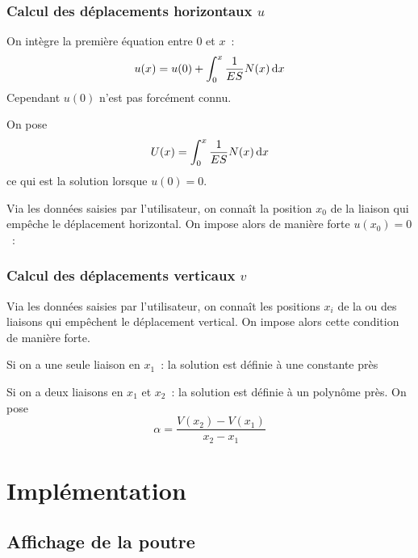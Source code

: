 \documentclass[draft]{report}
\begin{document}
\subsection{Calcul des déplacements horizontaux $u$}
On intègre la première équation entre $0$ et $x$~:
\[ u(x) = u(0) + \int_0^x \dfrac{1}{ES} N(x) \, \mathrm d x \]
Cependant $u(0)$ n'est pas forcément connu.

On pose
\[ U(x) = \int_0^x \dfrac{1}{ES} N(x) \, \mathrm d x \]
ce qui est la solution lorsque $u(0) = 0$.

Via les données saisies par l'utilisateur, on connaît la position $x_0$ de la liaison qui empêche le déplacement horizontal. On impose alors de manière forte $u(x_0) = 0$~:


\subsection{Calcul des déplacements verticaux $v$}

Via les données saisies par l'utilisateur, on connaît les positions $x_i$ de la ou des liaisons qui empêchent le déplacement vertical. On impose alors cette condition de manière forte.

Si on a une seule liaison en $x_1$~: la solution est définie à une constante près

Si on a deux liaisons en $x_1$ et $x_2$~: la solution est définie à un polynôme près. On pose
\[ \alpha = \dfrac{ V(x_2)-V(x_1) }{ x_2-x_1 } \]






\chapter{Implémentation}


\section{Affichage de la poutre}

\end{document}
